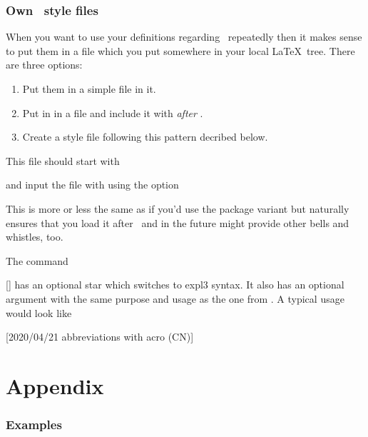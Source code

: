\documentclass{acro-manual}
\begin{document}
\section{Own \acro\ style files}
When you want to use your definitions regarding \acro\ repeatedly then it
makes sense to put them in a file which you put somewhere in your local
\LaTeX\ tree.  There are three options:
\begin{enumerate}
  \item Put them in a simple  file in  it.
  \item Put in in a  file and include it with 
    \emph{after} \acro.
  \item Create a style file following this pattern decribed below.
\end{enumerate}
\begin{center}
\end{center}
This file should start with
\begin{sourcecode}
\end{sourcecode}
and input the file with  using the option
\begin{options}
    This is more or less the same as if you'd use the package variant but
    naturally ensures that you load it after \acro\ and in the future might
    provide other bells and whistles, too.
\end{options}
The command
\begin{commands}
  [\sarg{}]
    has an optional star which switches to expl3 syntax.  It also has an
    optional argument  with the same purpose and usage as
    the one from . A typical usage would look like
\end{commands}
\begin{sourcecode}
  [2020/04/21 abbreviations with acro (CN)]
  \NewDocumentCommand{}
  \NewDocumentCommand{}
\end{sourcecode}
  
\clearpage
\appendix
\part{Appendix}\label{part:appendix}

\section{Examples}\label{sec:examples}

\listexamplefiles

\printacronyms[
  preamble = {\label{sec:acronyms}Below all abbreviations are listed which
    have been defined for the manual.} ,
  exclude = {exclude,glossary}
]

\printbibliography
\end{document}
